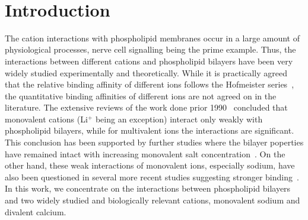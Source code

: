 \documentclass[pre,aps,floatfix,authordate1-4,twocolumn]{revtex4-1}
\begin{document}
~\vspace{0.3cm}\\
{\it \bf} 

\section{Introduction}

The cation interactions with phospholipid membranes occur in a large amount
of physiological processes, nerve cell signalling being the prime example.
Thus, the interactions between different cations and phospholipid bilayers have been very widely studied experimentally
and theoretically. While it is practically agreed that the relative binding affinity of different
ions follows the Hofmeister series~\cite{eisenberg79,cevc90,tocanne90,binder02,celma07,leontidis09,vacha09a,klasczyk10,harb13}, the quantitative binding affinities of different
ions are not agreed on in the literature. The extensive reviews of the work done prior 1990~\cite{cevc90,tocanne90}
concluded that monovalent cations (Li$^+$ being an exception) interact only weakly with phospholipid bilayers, 
while for multivalent ions the interactions are significant. This conclusion has been supported by
further studies where the bilayer poperties have remained intact with increasing monovalent salt 
concentration~\cite{binder02,pabst07,filippov09}. On the other hand, these weak interactions of monovalent ions, especially
sodium, have also been questioned in several more recent studies suggesting stronger 
binding~\cite{bockmann03,bockmann04,vacha09a,manyes05,manyes06,fukuma07,leontidis09,ferber11,morata12,klasczyk10,harb13}. In this work, we concentrate on the 
interactions between phospholipid bilayers and two widely studied and biologically relevant cations, monovalent sodium and divalent calcium.
\end{document}
